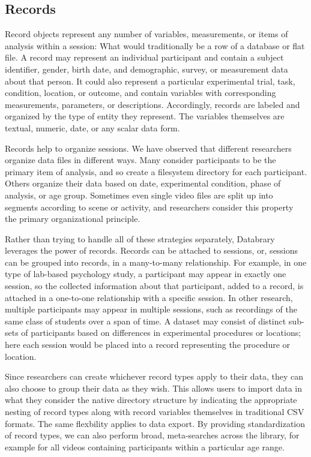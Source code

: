 \documentclass{sig-alternate}
\begin{document}
\subsection{Records}

Record objects represent any number of variables, measurements, or items of analysis within a session: What would traditionally be a row of a database or flat file.
A record may represent an individual participant and contain a subject identifier, gender, birth date, and demographic, survey, or measurement data about that person.
It could also represent a particular experimental trial, task, condition, location, or outcome, and contain variables with corresponding measurements, parameters, or descriptions.
Accordingly, records are labeled and organized by the type of entity they represent.
The variables themselves are textual, numeric, date, or any scalar data form.

Records help to organize sessions.
We have observed that different researchers organize data files in different ways.
Many consider participants to be the primary item of analysis, and so create a filesystem directory for each participant.
Others organize their data based on date, experimental condition, phase of analysis, or age group.
Sometimes even single video files are split up into segments according to scene or activity, and researchers consider this property the primary organizational principle.

Rather than trying to handle all of these strategies separately, Databrary leverages the power of records.
Records can be attached to sessions, or, sessions can be grouped into records, in a many-to-many relationship.
For example, in one type of lab-based psychology study, a participant may appear in exactly one session, so the collected information about that participant, added to a record, is attached in a one-to-one relationship with a specific session.
In other research, multiple participants may appear in multiple sessions, such as recordings of the same class of students over a span of time.
A dataset may consist of distinct sub-sets of participants based on differences in experimental procedures or locations; here each session would be placed into a record representing the procedure or location.

Since researchers can create whichever record types apply to their data, they can also choose to group their data as they wish.
This allows users to import data in what they consider the native directory structure by indicating the appropriate nesting of record types along with record variables themselves in traditional CSV formats. 
The same flexbility applies to data export.
By providing standardization of record types, we can also perform broad, meta-searches across the library, for example for all videos containing participants within a particular age range.
\end{document}

